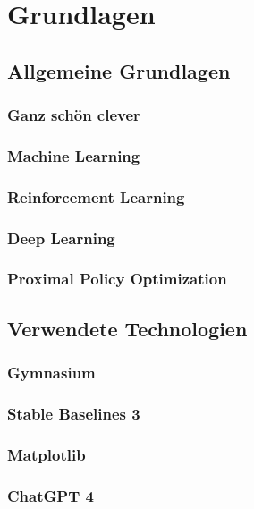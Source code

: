 \section{Grundlagen}
\subsection{Allgemeine Grundlagen}
\subsubsection{Ganz schön clever}
\subsubsection{Machine Learning}
\subsubsection{Reinforcement Learning}
\subsubsection{Deep Learning}
\subsubsection{Proximal Policy Optimization}
\subsection{Verwendete Technologien}
\subsubsection{Gymnasium}
\subsubsection{Stable Baselines 3}
\subsubsection{Matplotlib}
\subsubsection{ChatGPT 4}
